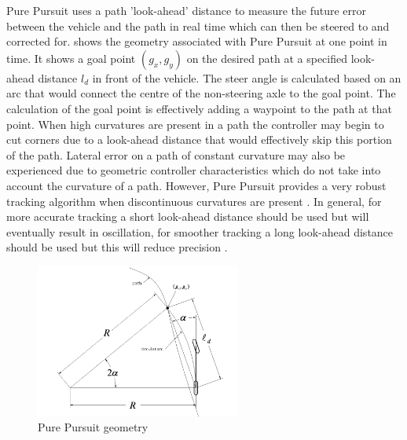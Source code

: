 \documentclass[main.tex]{subfiles}
\begin{document}
Pure Pursuit uses a path 'look-ahead' distance to measure the future error between the vehicle and the path in real time which can then be steered to and corrected for.  shows the geometry associated with Pure Pursuit at one point in time. It shows a goal point $(g_x, g_y)$ on the desired path at a specified look-ahead distance $l_d$ in front of the vehicle. The steer angle is calculated based on an arc that would connect the centre of the non-steering axle to the goal point. The calculation of the goal point is effectively adding a waypoint to the path at that point. When high curvatures are present in a path the controller may begin to cut corners due to a look-ahead distance that would effectively skip this portion of the path. Lateral error on a path of constant curvature may also be experienced due to geometric controller characteristics which do not take into account the curvature of a path. However, Pure Pursuit provides a very robust tracking algorithm when discontinuous curvatures are present \parencite{snider2009}. In general, for more accurate tracking a short look-ahead distance should be used but will eventually result in oscillation, for smoother tracking a long look-ahead distance should be used but this will reduce precision \parencite{snider2009}.
\begin{figure}[ht]
\includegraphics[width=0.6\textwidth]{3-LiteratureReview/purePursuitGoal.png}
\centering
\caption[Pure Pursuit geometry]{Pure Pursuit geometry \parencite{snider2009}} 
\end{figure}
\end{document}
